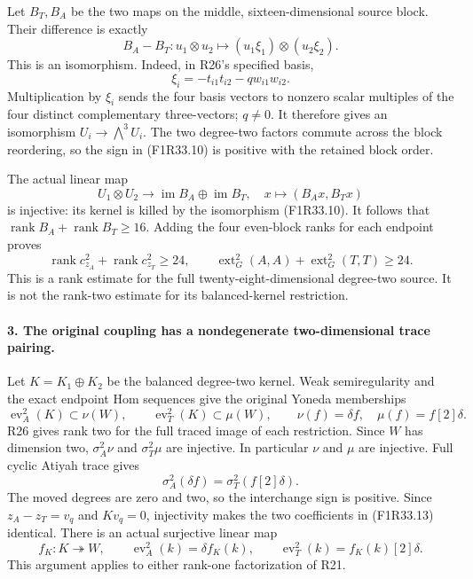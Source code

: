 Let $B_T,B_A$ be the two maps on the
middle, sixteen-dimensional source block.
Their difference is exactly
\[
 B_A-B_T:
       u_1\otimes u_2\longmapsto
                  (u_1\xi_1)\otimes(u_2\xi_2).
 \tag{F1R33.10}
\]
This is an isomorphism. Indeed, in R26's
specified basis,
\[
       \xi_i=-t_{i1}t_{i2}-q w_{i1}w_{i2}.
\]
Multiplication by $\xi_i$ sends the four
basis vectors to nonzero scalar multiples
of the four distinct complementary
three-vectors; $q\ne0$. It therefore gives
an isomorphism $U_i\to\bigwedge^3U_i$.
The two degree-two factors commute across
the block reordering, so the sign in
(F1R33.10) is positive with the retained
block order.

The actual linear map
\[
 U_1\otimes U_2\longrightarrow
          \operatorname{im}B_A\oplus\operatorname{im}B_T,
                 \quad x\longmapsto(B_Ax,B_Tx)
 \tag{F1R33.11}
\]
is injective: its kernel is killed by
the isomorphism (F1R33.10).
It follows that
$\operatorname{rank}B_A+\operatorname{rank}B_T\ge16$.
Adding the four even-block ranks for each
endpoint proves
\[
       \operatorname{rank}c_{z_A}^2
           +\operatorname{rank}c_{z_T}^2\ge24,
 \qquad
       \operatorname{ext}^2_G(A,A)
           +\operatorname{ext}^2_G(T,T)\ge24.
 \tag{F1R33.12}
\]
This is a rank estimate for the full
twenty-eight-dimensional degree-two
source. It is not the rank-two estimate
for its balanced-kernel restriction.

\paragraph{3. The original coupling has a nondegenerate two-dimensional trace pairing.}
Let $K=K_1\oplus K_2$ be the balanced
degree-two kernel. Weak semiregularity
and the exact endpoint Hom sequences
give the original Yoneda memberships
\[
 \operatorname{ev}_A^2(K)\subset\nu(W),\qquad
 \operatorname{ev}_T^2(K)\subset\mu(W),\qquad
 \nu(f)=\delta f,\quad \mu(f)=f[2]\delta.
 \tag{F1R33.13}
\]
R26 gives rank two for the full traced
image of each restriction. Since $W$
has dimension two, $\sigma_A^2\nu$
and $\sigma_T^2\mu$ are injective.
In particular $\nu$ and $\mu$ are
injective. Full cyclic Atiyah trace gives
\[
                \sigma_A^2(\delta f)
                      =\sigma_T^2(f[2]\delta).
 \tag{F1R33.14}
\]
The moved degrees are zero and two,
so the interchange sign is positive.
Since $z_A-z_T=v_q$ and $K v_q=0$,
injectivity makes the two coefficients
in (F1R33.13) identical. There is an
actual surjective linear map
\[
 f_K:K\twoheadrightarrow W,\qquad
 \operatorname{ev}_A^2(k)=\delta f_K(k),\qquad
 \operatorname{ev}_T^2(k)=f_K(k)[2]\delta.
 \tag{F1R33.15}
\]
This argument applies to either
rank-one factorization of R21.

